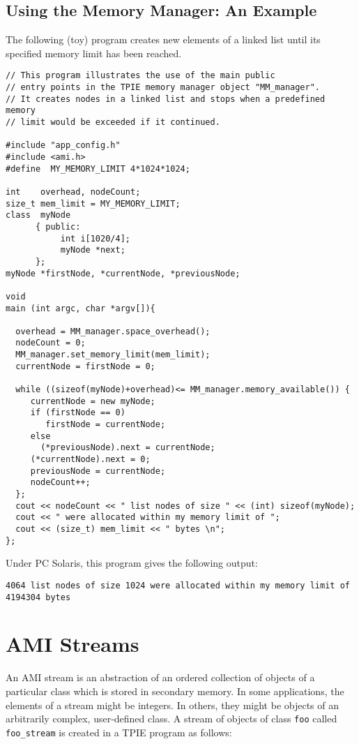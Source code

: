 \subsection{Using the Memory Manager: An Example}

The following (toy) program creates new elements of a linked
list until its specified memory limit has been reached.

\begin{verbatim}
// This program illustrates the use of the main public 
// entry points in the TPIE memory manager object "MM_manager".
// It creates nodes in a linked list and stops when a predefined memory 
// limit would be exceeded if it continued.

#include "app_config.h"
#include <ami.h>
#define  MY_MEMORY_LIMIT 4*1024*1024;

int    overhead, nodeCount;
size_t mem_limit = MY_MEMORY_LIMIT;
class  myNode 
      { public:
           int i[1020/4];
           myNode *next;
      };
myNode *firstNode, *currentNode, *previousNode;

void 
main (int argc, char *argv[]){

  overhead = MM_manager.space_overhead();
  nodeCount = 0;
  MM_manager.set_memory_limit(mem_limit);
  currentNode = firstNode = 0;

  while ((sizeof(myNode)+overhead)<= MM_manager.memory_available()) { 
     currentNode = new myNode;
     if (firstNode == 0) 
        firstNode = currentNode;
     else
       (*previousNode).next = currentNode;
     (*currentNode).next = 0;
     previousNode = currentNode;
     nodeCount++;
  };
  cout << nodeCount << " list nodes of size " << (int) sizeof(myNode); 
  cout << " were allocated within my memory limit of ";
  cout << (size_t) mem_limit << " bytes \n";
};
\end{verbatim}

Under PC Solaris, this program gives the following output:
\begin{verbatim}
4064 list nodes of size 1024 were allocated within my memory limit of 4194304 bytes
\end{verbatim}


\section{AMI Streams}
\label{sec:ami_stream-ref}

\tobeextended
{}
An AMI stream is
an abstraction of an ordered collection of objects of a
particular class which is stored in secondary memory.  In some
applications, the elements of a stream might be integers.
In others, they might be objects of an arbitrarily complex, user-defined
class.  A stream of objects of class \verb|foo| called
\verb|foo_stream| is created in a TPIE program as follows:

